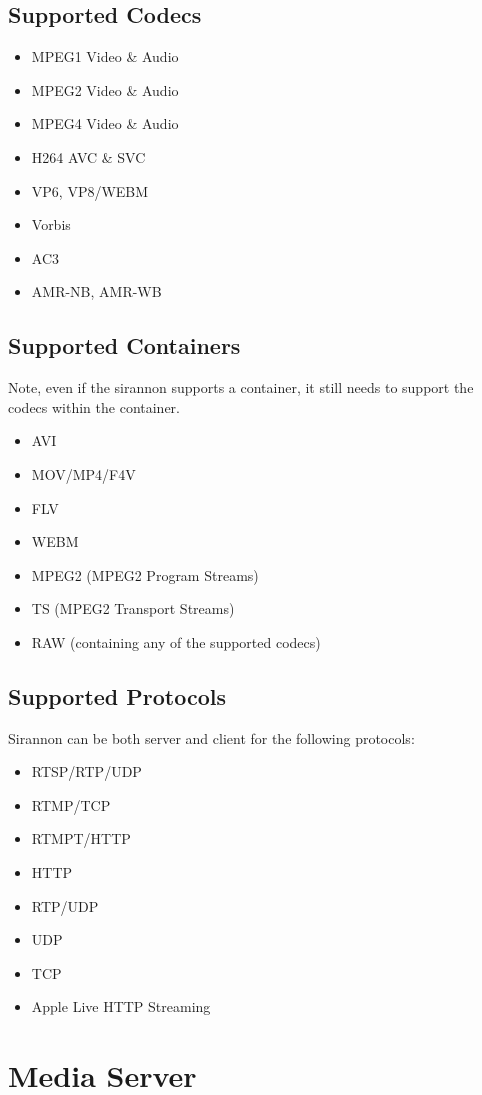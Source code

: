 \documentclass[12pt]{report}
\begin{document}
\section{Supported Codecs}
\begin{itemize}
	\item MPEG1 Video \& Audio
	\item MPEG2 Video \& Audio
	\item MPEG4 Video \& Audio
	\item H264 AVC \& SVC
	\item VP6, VP8/WEBM
	\item Vorbis
	\item AC3
	\item AMR-NB, AMR-WB
\end{itemize}

\section{Supported Containers}
Note, even if the sirannon supports a container, it still needs to support the codecs within the container.
\begin{itemize}
\item AVI
\item MOV/MP4/F4V
\item FLV
\item WEBM
\item MPEG2 (MPEG2 Program Streams)
\item TS (MPEG2 Transport Streams)
\item RAW (containing any of the supported codecs)
\end{itemize}

\section{Supported Protocols}
Sirannon can be both server and client for the following protocols:
\begin{itemize}
\item RTSP/RTP/UDP
\item RTMP/TCP
\item RTMPT/HTTP
\item HTTP
\item RTP/UDP
\item UDP
\item TCP
\item Apple Live HTTP Streaming
\end{itemize}

\chapter{Media Server}
\end{document}
